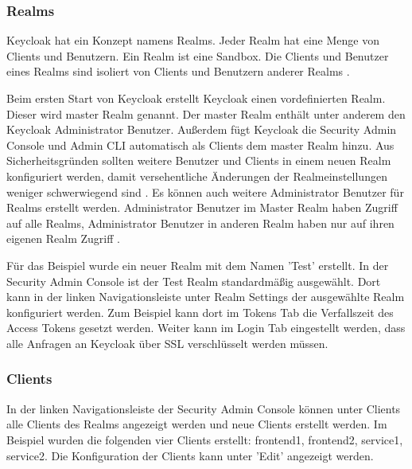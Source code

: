 \subsubsection{Realms}

Keycloak hat ein Konzept namens Realms. Jeder Realm hat eine Menge von Clients und Benutzern. Ein Realm ist eine Sandbox. Die Clients und Benutzer eines Realms sind isoliert von Clients und Benutzern anderer Realms \cite{EB46}.

Beim ersten Start von Keycloak erstellt Keycloak einen vordefinierten Realm. Dieser wird master Realm genannt. Der master Realm enthält unter anderem den Keycloak Administrator Benutzer. Außerdem fügt Keycloak die Security Admin Console und Admin CLI automatisch als Clients dem master Realm hinzu. Aus Sicherheitsgründen sollten weitere Benutzer und Clients in einem neuen Realm konfiguriert werden, damit versehentliche Änderungen der Realmeinstellungen weniger schwerwiegend sind \cite{EB47}. Es können auch weitere Administrator Benutzer für Realms erstellt werden. Administrator Benutzer im Master Realm haben Zugriff auf alle Realms,  Administrator Benutzer in anderen Realm haben nur auf ihren eigenen Realm Zugriff \cite{EB47}.

Für das Beispiel wurde ein neuer Realm mit dem Namen 'Test' erstellt. In der Security Admin Console ist der Test Realm standardmäßig ausgewählt. Dort kann in der linken Navigationsleiste unter Realm Settings der ausgewählte Realm konfiguriert werden. Zum Beispiel kann dort im Tokens Tab die Verfallszeit des Access Tokens gesetzt werden. Weiter kann im Login Tab eingestellt werden, dass alle Anfragen an Keycloak über SSL verschlüsselt werden müssen. %

\subsubsection{Clients}

In der linken Navigationsleiste der Security Admin Console können unter Clients alle Clients des Realms angezeigt werden und neue Clients erstellt werden. Im Beispiel wurden die folgenden vier Clients erstellt: frontend1, frontend2, service1, service2. Die Konfiguration der Clients kann unter 'Edit' angezeigt werden.

